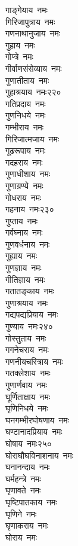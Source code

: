 \begin{multicols}{\maxColumns}
\begin{flushleft}
गाङ्गेयाय~नमः\\
गिरिजापुत्राय~नमः\\
गणनाथानुजाय~नमः\\
गुहाय~नमः\\
गोप्त्रे~नमः\\
गीर्वाणसंसेव्याय~नमः\\
गुणातीताय~नमः\\
गुहाश्रयाय~नमः\hfill २२०\\
गतिप्रदाय~नमः\\
गुणनिधये~नमः\\
गम्भीराय~नमः\\
गिरिजात्मजाय~नमः\\
गूढरूपाय~नमः\\
गदहराय~नमः\\
गुणाधीशाय~नमः\\
गुणाग्रण्ये~नमः\\
गोधराय~नमः\\
गहनाय~नमः\hfill २३०\\
गुप्ताय~नमः\\
गर्वघ्नाय~नमः\\
गुणवर्धनाय~नमः\\
गुह्याय~नमः\\
गुणज्ञाय~नमः\\
गीतिज्ञाय~नमः\\
गतातङ्काय~नमः\\
गुणाश्रयाय~नमः\\
गद्यपद्यप्रियाय~नमः\\
गुण्याय~नमः\hfill २४०\\
गोस्तुताय~नमः\\
गगनेचराय~नमः\\
गणनीयचरित्राय~नमः\\
गतक्लेशाय~नमः\\
गुणार्णवाय~नमः\\
घूर्णिताक्षाय~नमः\\
घृणिनिधये~नमः\\
घनगम्भीरघोषणाय~नमः\\
घण्टानादप्रियाय~नमः\\
घोषाय~नमः\hfill २५०\\
घोराघौघविनाशनाय~नमः\\
घनानन्दाय~नमः\\
घर्महन्त्रे~नमः\\
घृणावते~नमः\\
घृष्टिपातकाय~नमः\\
घृणिने~नमः\\
घृणाकराय~नमः\\
घोराय~नमः\\

\end{flushleft}
\end{multicols}
